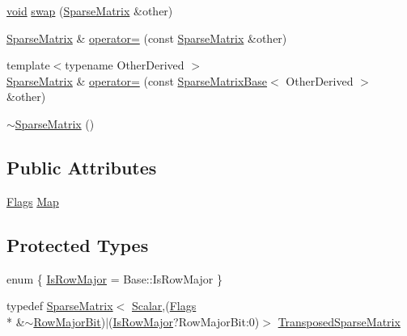 \begin{DoxyCompactItemize}
\item 
\hyperlink{group___u_a_v_objects_plugin_ga444cf2ff3f0ecbe028adce838d373f5c}{void} \hyperlink{class_sparse_matrix_ac685cf96fc62633c547f07e3d48cb1c0}{swap} (\hyperlink{class_sparse_matrix}{Sparse\-Matrix} \&other)
\item 
\hyperlink{class_sparse_matrix}{Sparse\-Matrix} \& \hyperlink{class_sparse_matrix_aeb983f5d512f90c4b9559eaad1418575}{operator=} (const \hyperlink{class_sparse_matrix}{Sparse\-Matrix} \&other)
\item 
{\footnotesize template$<$typename Other\-Derived $>$ }\\\hyperlink{class_sparse_matrix}{Sparse\-Matrix} \& \hyperlink{class_sparse_matrix_a85eb66aa8d9d7215185e25b16b326c7d}{operator=} (const \hyperlink{class_sparse_matrix_base}{Sparse\-Matrix\-Base}$<$ Other\-Derived $>$ \&other)
\item 
\hyperlink{class_sparse_matrix_a830fd194ea3b7c5846a21d109e352868}{$\sim$\-Sparse\-Matrix} ()
\end{DoxyCompactItemize}
\subsection*{Public Attributes}
\begin{DoxyCompactItemize}
\item 
\hyperlink{class_sparse_matrix_base_af601f771c204b3ca254a52085525004cadb11b5d4625dc81c28848af1ec6dac18}{Flags} \hyperlink{class_sparse_matrix_a0362f04c2a71fde43bf7c690d05bb0ae}{Map}
\end{DoxyCompactItemize}
\subsection*{Protected Types}
\begin{DoxyCompactItemize}
\item 
enum \{ \hyperlink{class_sparse_matrix_a2a3784d06c6c399cf3ef75b1e75c0850a8f7216460d73e3a1220d1d8559ec7005}{Is\-Row\-Major} = Base\-:\-:Is\-Row\-Major
 \}
\item 
typedef \hyperlink{class_sparse_matrix}{Sparse\-Matrix}$<$ \hyperlink{class_sparse_matrix_base_af39d70f2b7e775e9e17b666cd24128c8}{Scalar},(\hyperlink{class_sparse_matrix_base_af601f771c204b3ca254a52085525004cadb11b5d4625dc81c28848af1ec6dac18}{Flags} \\*
\&$\sim$\hyperlink{group__flags_ga7bd49e7b260e869e10fb9dc4fd081a85}{Row\-Major\-Bit})$|$(\hyperlink{class_sparse_matrix_a2a3784d06c6c399cf3ef75b1e75c0850a8f7216460d73e3a1220d1d8559ec7005}{Is\-Row\-Major}?Row\-Major\-Bit\-:0)$>$ \hyperlink{class_sparse_matrix_a3e2968c1ff32087e31d8932fdff0f323}{Transposed\-Sparse\-Matrix}
\end{DoxyCompactItemize}
